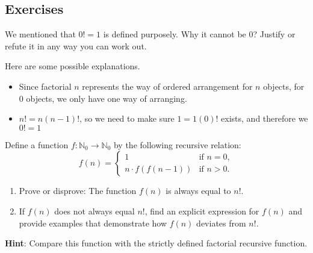         
        \subsection{Exercises}
        



        \begin{exercise}
            We mentioned that $0!=1$ is defined purposely. Why it cannot be 0?
            Justify or refute it in any way you can work out. 
        \end{exercise}
        \begin{solution}
            Here are some possible explanations.
            \begin{itemize}
                \item Since factorial $n$ represents the way of ordered arrangement
                for $n$ objects, for 0 objects, we only have one way of arranging.
                \item $n!=n(n-1)!$, so we need to make sure $1 = 1(0)!$ exists, and
                therefore we  $0!=1$
            \end{itemize}
        \end{solution}
        \begin{exercise}
            Define a function \( f: \mathbb{N}_0 \rightarrow \mathbb{N}_0 \) by the following recursive relation:
            \[
            f(n) =
            \begin{cases} 
            1 & \text{if } n = 0, \\
            n \cdot f(f(n-1)) & \text{if } n > 0.
            \end{cases}
            \]
            \begin{enumerate}
                \item Prove or disprove: The function \( f(n) \) is always equal to \( n! \).
                \item If \( f(n) \) does not always equal \( n! \), find an explicit expression for \( f(n) \) and provide examples that demonstrate how \( f(n) \) deviates from \( n! \).
            \end{enumerate}
            \textbf{Hint}: Compare this function with the strictly defined factorial
            recursive function.
        \end{exercise}
        
